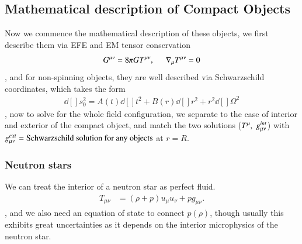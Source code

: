 \documentclass[a4paper, 12pt]{article}
\begin{document}
      \subsection{Mathematical description of Compact Objects}%
        \label{sub:Mathematical description of Compact Objects}
        Now we commence the mathematical description of these
        objects, we first describe them via EFE and EM tensor
        conservation
        \begin{align}
          \label{EFE for compact}
          G^{\mu \nu} = 8 \pi G T^{\mu \nu}, \hspace{0.5cm}
          \nabla_{\mu} T^{\mu \nu} = 0     
        \end{align}, and for non-spinning objects, they are well
        described via Schwarzschild coordinates, which takes the form 
        \begin{align}
          \label{Schwarzschild coordinates}
          \dd[]{s}^2_0 = A(t) \dd[]{t}^{2} + B(r) \dd[]{r}^{2} +
          r^2 \dd[]{\Omega}^{2}
        \end{align}, now to solve for the whole field
        configuration, we separate to the case of interior and
        exterior of the compact object, and match the two
        solutions (\( T^{\mu}, \hspace{0.1cm} g_{\mu \nu}^{int}  \))
        with \( g_{\mu \nu}^{ext} = \textnormal{Schwarzschild
        solution for any objects} \) at \( r = R \).
        \subsubsection{Neutron stars}%
          \label{sub:Neutron stars}
          
          We can treat the interior of a neutron star as perfect
          fluid. 
          \begin{align}
            \label{neutron perfect fluid}
            T_{\mu \nu} &= (\rho + p) u_{\mu} u_{\nu} + p g_{\mu
            \nu}. 
          \end{align}, and we also need an equation of state to
          connect \( p(\rho) \), though usually this exhibits
          great uncertainties as it depends on the interior
          microphysics of the neutron star.
\end{document}

